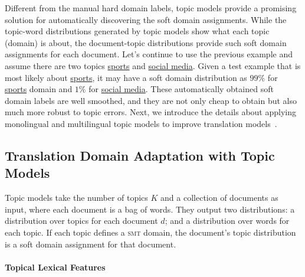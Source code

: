 Different from the manual hard domain labels, topic models provide a promising solution for automatically discovering the soft domain assignments. While the topic-word distributions generated by topic models show what each topic (domain) is about, the document-topic distributions provide such soft domain assignments for each document. Let's continue to use the previous example and assume there are two topics \underline{sports} and \underline{social media}. Given a test example that is most likely about \underline{sports}, it may have a soft domain distribution as $99\%$ for \underline{sports} domain and $1\%$ for \underline{social media}. These automatically obtained soft domain labels are well smoothed, and they are not only cheap to obtain but also much more robust to topic errors. Next, we introduce the details about applying monolingual and multilingual topic models to improve translation models~\citep{Eidelman-12,hu-14}.


\subsection{Translation Domain Adaptation with Topic Models}

Topic models take the number of topics $K$ and a collection of documents as input, where each document is a bag of words. They output two distributions: a distribution over topics for each document $d$; and a distribution over words for each topic. If each topic defines a \textsc{smt} domain, the document's topic distribution is a soft domain assignment for that document.


\paragraph{Topical Lexical Features}

